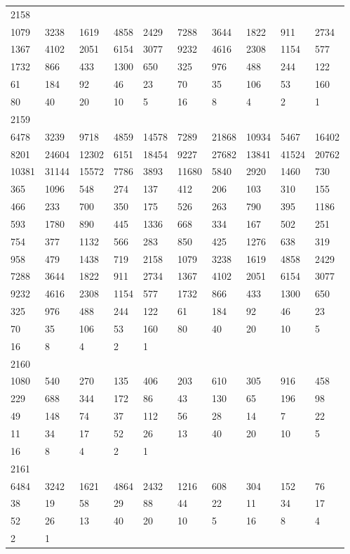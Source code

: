 \begin{longtable}{*{10}{l}}
2158&&&&&&&&&\\
1079& 3238& 1619& 4858& 2429& 7288& 3644& 1822& 911& 2734\\
1367& 4102& 2051& 6154& 3077& 9232& 4616& 2308& 1154& 577\\
1732& 866& 433& 1300& 650& 325& 976& 488& 244& 122\\
61& 184& 92& 46& 23& 70& 35& 106& 53& 160\\
80& 40& 20& 10& 5& 16& 8& 4& 2& 1\\

2159&&&&&&&&&\\
6478& 3239& 9718& 4859& 14578& 7289& 21868& 10934& 5467& 16402\\
8201& 24604& 12302& 6151& 18454& 9227& 27682& 13841& 41524& 20762\\
10381& 31144& 15572& 7786& 3893& 11680& 5840& 2920& 1460& 730\\
365& 1096& 548& 274& 137& 412& 206& 103& 310& 155\\
466& 233& 700& 350& 175& 526& 263& 790& 395& 1186\\
593& 1780& 890& 445& 1336& 668& 334& 167& 502& 251\\
754& 377& 1132& 566& 283& 850& 425& 1276& 638& 319\\
958& 479& 1438& 719& 2158& 1079& 3238& 1619& 4858& 2429\\
7288& 3644& 1822& 911& 2734& 1367& 4102& 2051& 6154& 3077\\
9232& 4616& 2308& 1154& 577& 1732& 866& 433& 1300& 650\\
325& 976& 488& 244& 122& 61& 184& 92& 46& 23\\
70& 35& 106& 53& 160& 80& 40& 20& 10& 5\\
16& 8& 4& 2& 1& \\

2160&&&&&&&&&\\
1080& 540& 270& 135& 406& 203& 610& 305& 916& 458\\
229& 688& 344& 172& 86& 43& 130& 65& 196& 98\\
49& 148& 74& 37& 112& 56& 28& 14& 7& 22\\
11& 34& 17& 52& 26& 13& 40& 20& 10& 5\\
16& 8& 4& 2& 1& \\

2161&&&&&&&&&\\
6484& 3242& 1621& 4864& 2432& 1216& 608& 304& 152& 76\\
38& 19& 58& 29& 88& 44& 22& 11& 34& 17\\
52& 26& 13& 40& 20& 10& 5& 16& 8& 4\\
2& 1& \\


\end{longtable}
